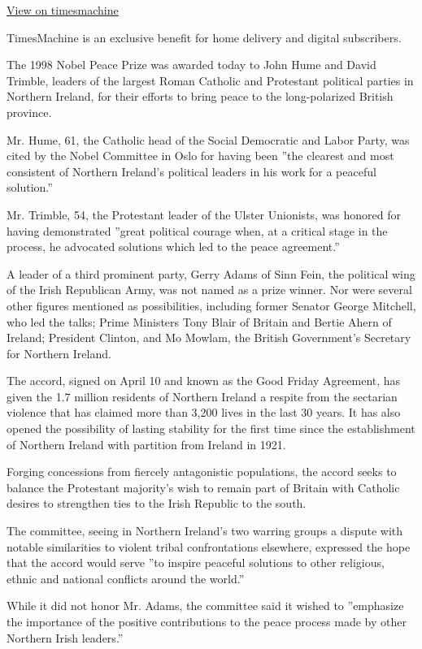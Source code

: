 \href{http://timesmachine.nytimes.com/timesmachine/1998/10/17/385980.html}{View
on timesmachine}

TimesMachine is an exclusive benefit for home delivery and digital
subscribers.

The 1998 Nobel Peace Prize was awarded today to John Hume and David
Trimble, leaders of the largest Roman Catholic and Protestant political
parties in Northern Ireland, for their efforts to bring peace to the
long-polarized British province.

Mr. Hume, 61, the Catholic head of the Social Democratic and Labor
Party, was cited by the Nobel Committee in Oslo for having been ''the
clearest and most consistent of Northern Ireland's political leaders in
his work for a peaceful solution.''

Mr. Trimble, 54, the Protestant leader of the Ulster Unionists, was
honored for having demonstrated ''great political courage when, at a
critical stage in the process, he advocated solutions which led to the
peace agreement.''

A leader of a third prominent party, Gerry Adams of Sinn Fein, the
political wing of the Irish Republican Army, was not named as a prize
winner. Nor were several other figures mentioned as possibilities,
including former Senator George Mitchell, who led the talks; Prime
Ministers Tony Blair of Britain and Bertie Ahern of Ireland; President
Clinton, and Mo Mowlam, the British Government's Secretary for Northern
Ireland.

The accord, signed on April 10 and known as the Good Friday Agreement,
has given the 1.7 million residents of Northern Ireland a respite from
the sectarian violence that has claimed more than 3,200 lives in the
last 30 years. It has also opened the possibility of lasting stability
for the first time since the establishment of Northern Ireland with
partition from Ireland in 1921.

Forging concessions from fiercely antagonistic populations, the accord
seeks to balance the Protestant majority's wish to remain part of
Britain with Catholic desires to strengthen ties to the Irish Republic
to the south.

The committee, seeing in Northern Ireland's two warring groups a dispute
with notable similarities to violent tribal confrontations elsewhere,
expressed the hope that the accord would serve ''to inspire peaceful
solutions to other religious, ethnic and national conflicts around the
world.''

While it did not honor Mr. Adams, the committee said it wished to
''emphasize the importance of the positive contributions to the peace
process made by other Northern Irish leaders.''

